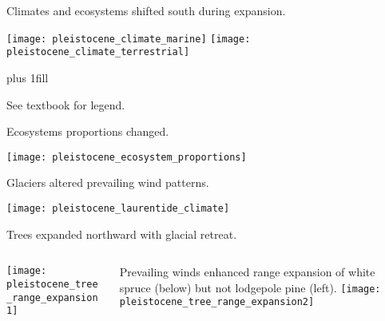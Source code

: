 \documentclass[t]{beamer}
\begin{document}



\begin{frame}[t]{Climates and ecosystems shifted south during expansion.}
	\vspace{-\baselineskip}
	\begin{center}
		\texttt{[image: pleistocene\_climate\_marine]}\hspace*{1cm}
		\texttt{[image: pleistocene\_climate\_terrestrial]}
	\end{center}
	
	\vskip0pt plus 1fill
	
	\hfill\tiny{See textbook for legend.}
\end{frame}

\begin{frame}{Ecosystems proportions changed.}
	\vspace{-\baselineskip}
	\begin{center}
		\texttt{[image: pleistocene\_ecosystem\_proportions]}
	\end{center}
\end{frame}

\begin{frame}{Glaciers altered prevailing wind patterns.}
	\vspace{-\baselineskip}
	\begin{center}
		\texttt{[image: pleistocene\_laurentide\_climate]}
	\end{center}
\end{frame}


\begin{frame}{Trees expanded northward with glacial retreat.}
	\begin{columns}[T]
		\begin{column}{0.3\textwidth}
			\texttt{[image: pleistocene\_tree\_range\_expansion1]}
		\end{column}
		\begin{column}{0.65\textwidth}
			Prevailing winds enhanced range expansion of white spruce (below) but not lodgepole pine (left).\vspace*{0.6\baselineskip}
			\texttt{[image: pleistocene\_tree\_range\_expansion2]}
		\end{column}
	\end{columns}
\end{frame}
\end{document}
